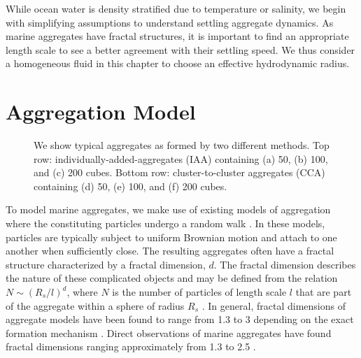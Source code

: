 \par
While ocean water is density stratified due to temperature or salinity, we begin with simplifying assumptions to understand settling aggregate dynamics. As marine aggregates have fractal structures, it is important to find an appropriate length scale to see a better agreement with their settling speed. We thus consider a homogeneous fluid in this chapter to choose an effective hydrodynamic radius. 



\section{Aggregation Model}
\label{sec_model}

\begin{figure}[ht]
\begin{center}
\end{center}
\caption{We show typical aggregates as formed by two different methods. Top row: individually-added-aggregates (IAA) containing (a) 50, (b) 100, and (c) 200 cubes. Bottom row: cluster-to-cluster aggregates (CCA) containing (d) 50, (e) 100, and (f) 200 cubes.}
\label{fig_rad_mass}
\end{figure}

To model marine aggregates, we make use of existing models of aggregation where the constituting particles undergo a random walk
\cite{rosenstock_cluster_1980, witten_diffusion-limited_1981,witten_tenuous_1986,kolb_anisotropic_1987}. 
In these models, particles are typically subject to uniform Brownian motion and attach to one another when 
sufficiently close. The resulting aggregates often have a fractal structure characterized by a fractal dimension, $d$. The fractal dimension describes the nature of these complicated objects and may be defined from the relation $N\sim(R_s/l)^d$, where $N$ is the number of particles of length scale $l$ that are part of the aggregate within a sphere of radius $R_s$ \cite{witten_tenuous_1986}. In general, fractal dimensions of aggregate models have been found to range from 1.3 to 3 depending on the exact formation 
mechanism \cite{witten_diffusion-limited_1981, kolb_anisotropic_1987,gmachowski_calculation_2002}. 
Direct observations of marine aggregates have found fractal dimensions ranging approximately from 1.3 to 2.5 \cite{alldredge_situ_1988,jackson_aggregation_1998}.
   
